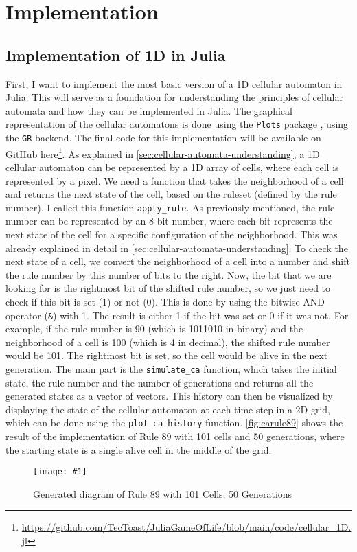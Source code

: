 \documentclass[a4paper,12pt]{llncs}
\numberwithin{equation}{section}
\newcommand{\imagewithwidth}[5]{
  \begin{figure}[htbp]%
    \begin{center}%
      \texttt{[image: \#1]}%
      \caption[#5]{#4}%
      \label{#3}%
    \end{center}%
  \end{figure}
}
\begin{document}
\section{Implementation}
\subsection{Implementation of 1D in Julia}
First, I want to implement the most basic version of a 1D cellular automaton in Julia.
This will serve as a foundation for understanding the principles of cellular automata and how they can be implemented in Julia.
The graphical representation of the cellular automatons is done using the \texttt{Plots} package \cite{JuliaPlots}, using the \texttt{GR} \cite{JuliaGR,GR} backend.
The final code for this implementation will be available on GitHub here\footnote{\url{https://github.com/TecToast/JuliaGameOfLife/blob/main/code/cellular_1D.jl}}.
As explained in \autoref{sec:cellular-automata-understanding}, a 1D cellular automaton can be represented by a 1D array of cells, where each cell is represented by a pixel.
We need a function that takes the neighborhood of a cell and returns the next state of the cell, based on the ruleset (defined by the rule number). I called this function \texttt{apply\_rule}.
As previously mentioned, the rule number can be represented by an 8-bit number, where each bit represents the next state of the cell for a specific configuration of the neighborhood.
This was already explained in detail in \autoref{sec:cellular-automata-understanding}.
To check the next state of a cell, we convert the neighborhood of a cell into a number and shift the rule number by this number of bits to the right. Now, the bit that we are looking for is the rightmost bit of the shifted rule number, so we just need to check if this bit is set (1) or not (0).
This is done by using the bitwise AND operator (\texttt{\&}) with 1. The result is either 1 if the bit was set or 0 if it was not.
For example, if the rule number is 90 (which is 1011010 in binary) and the neighborhood of a cell is 100 (which is 4 in decimal), the shifted rule number would be 101. The rightmost bit is set, so the cell would be alive in the next generation.
The main part is the \texttt{simulate\_ca} function, which takes the initial state, the rule number and the number of generations and returns all the generated states as a vector of vectors.
This history can then be visualized by displaying the state of the cellular automaton at each time step in a 2D grid, which can be done using the \texttt{plot\_ca\_history} function.
\autoref{fig:carule89} shows the result of the implementation of Rule 89 with 101 cells and 50 generations, where the starting state is a single alive cell in the middle of the grid.
\imagewithwidth{figures/carule89}{0.6\textwidth}{fig:carule89}{Generated diagram of Rule 89 with 101 Cells, 50 Generations}{}
\end{document}
